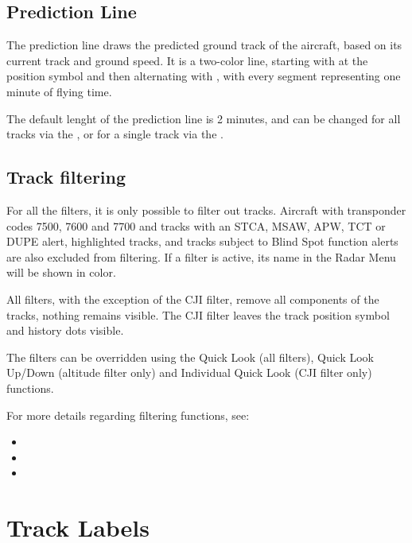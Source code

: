 \documentclass[a4paper,oneside,11pt]{memoir}
\begin{document}
\subsection{Prediction Line}

The prediction line draws the predicted ground track of the aircraft, based on its current track and ground speed. It is a two-color line, starting with  at the position symbol and then alternating with , with every segment representing one minute of flying time. 

The default lenght of the prediction line is 2 minutes, and can be changed for all tracks via the , or for a single track via the .


\subsection{Track filtering}\label{win:tf}

For all the filters, it is only possible to filter out  tracks. Aircraft with transponder codes 7500, 7600 and 7700 and tracks with an STCA, MSAW, APW, TCT or DUPE alert, highlighted tracks, and tracks subject to Blind Spot function alerts are also excluded from filtering. If a filter is active, its name in the Radar Menu will be shown in  color.

\bigskip

All filters, with the exception of the CJI filter, remove all components of the tracks, nothing remains visible. The CJI filter leaves the track position symbol and history dots visible.

The filters can be overridden using the Quick Look (all filters), Quick Look Up/Down (altitude filter only) and Individual Quick Look (CJI filter only) functions.

\bigskip

For more details regarding filtering functions, see:

\begin{itemize}
  \item {}
  \item {}
  \item {}
\end{itemize}

\section{Track Labels}
\label{tlabel}
\end{document}
